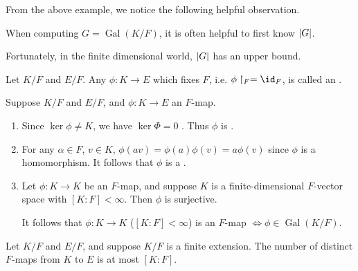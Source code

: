 \documentclass[notoc,notitlepage,nobib]{tufte-book}
\DeclareMathOperator{\Gal}{Gal}
\begin{document}
From the above example, we notice the following helpful observation.

\begin{remark}
  When computing $G = \Gal(K / F)$, it is often helpful to first know $\left|G\right|$.
\end{remark}

Fortunately, in the finite dimensional world, $\left|G\right|$ has an upper bound.

\begin{defn}[$F$-map]\label{defn:_f_map}
  Let $K / F$ and $E / F$. Any  $\phi : K \to E$ which
  fixes $F$, i.e. $\phi \restriction_F = \id_F$, is called an
  .
\end{defn}

\begin{remark}
  Suppose $K / F$ and $E / F$, and $\phi : K \to E$ an $F$-map.
  \begin{enumerate}
    \item Since $\ker \phi \neq K$, we have $\ker \Phi = 0$ . Thus $\phi$ is
      .
    \item For any $\alpha \in F$, $v \in K$, $\phi(av) = \phi(a) \phi(v) = a
      \phi(v)$ since $\phi$ is a homomorphism. It follows that $\phi$ is a
      .
    \item Let $\phi : K \to K$ be an $F$-map, and suppose $K$ is a
      finite-dimensional $F$-vector space with $[ K : F ] < \infty$. Then $\phi
      $ is surjective.

      It follows that $\phi : K \to K$ ($[K : F] < \infty$) is an $F$-map $\iff
      \phi \in \Gal(K / F)$.
  \end{enumerate}
\end{remark}

\begin{lemma}\label{lemma:number_of_distinct_f_maps}
  Let $K / F$ and $E / F$, and suppose $K / F$ is a finite extension. The number
  of distinct $F$-maps from $K$ to $E$ is at most $[K : F]$.
\end{lemma}
\end{document}
